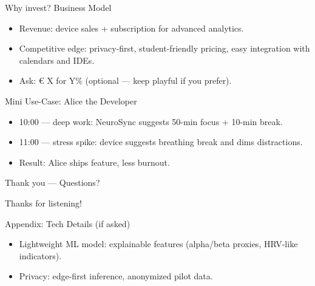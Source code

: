 \documentclass[10pt]{beamer}
\begin{document}
\begin{frame}{Why invest? Business Model}
    \begin{itemize}
        \item Revenue: device sales + subscription for advanced analytics.
        \item Competitive edge: privacy-first, student-friendly pricing, easy integration with calendars and IDEs.
        \item Ask: € X for Y\% (optional — keep playful if you prefer).
    \end{itemize}
\end{frame}

\begin{frame}{Mini Use-Case: Alice the Developer}
    \begin{itemize}
        \item 10:00 — deep work: NeuroSync suggests 50-min focus + 10-min break.
        \item 11:00 — stress spike: device suggests breathing break and dims distractions.
        \item Result: Alice ships feature, less burnout.
    \end{itemize}
\end{frame}

\begin{frame}{Thank you — Questions?}
    \begin{center}
        \Large{Thanks for listening!}
    \end{center}
\end{frame}

\begin{frame}{Appendix: Tech Details (if asked)}
    \begin{itemize}
        \item Lightweight ML model: explainable features (alpha/beta proxies, HRV-like indicators).
        \item Privacy: edge-first inference, anonymized pilot data.
    \end{itemize}
    \end{frame}
\end{document}
